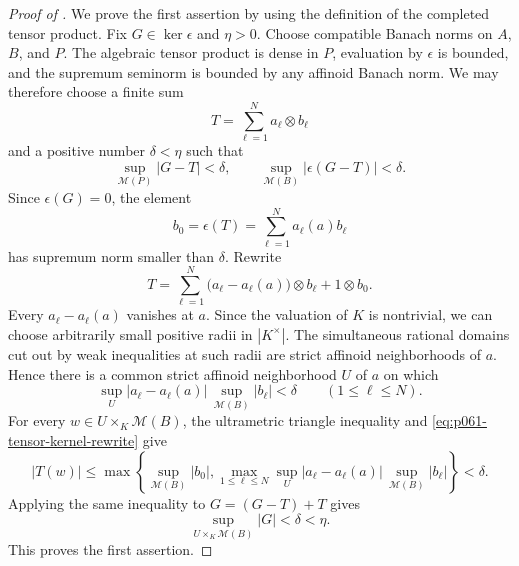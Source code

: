 
\begin{proof}[Proof of ]
We prove the first assertion by using the definition of the completed
tensor product.  Fix \(G\in\ker\epsilon\) and \(\eta>0\).  Choose
compatible Banach norms on \(A\), \(B\), and \(P\).  The algebraic tensor
product is dense in \(P\), evaluation by \(\epsilon\) is bounded, and
the supremum seminorm is bounded by any affinoid Banach norm.  We may
therefore choose a finite sum
\[
                       T=\sum_{\ell=1}^N a_\ell\otimes b_\ell
\]
and a positive number \(\delta<\eta\) such that
\[
 \sup_{\mathcal M(P)}|G-T|<\delta,
 \qquad
 \sup_{\mathcal M(B)}|\epsilon(G-T)|<\delta.
\]
Since \(\epsilon(G)=0\), the element
\[
                       b_0=\epsilon(T)=
                       \sum_{\ell=1}^Na_\ell(a)b_\ell
\]
has supremum norm smaller than \(\delta\).  Rewrite
\begin{equation}
\label{eq:p061-tensor-kernel-rewrite}
 T=\sum_{\ell=1}^N
       \bigl(a_\ell-a_\ell(a)\bigr)\otimes b_\ell+1\otimes b_0.
\end{equation}
Every \(a_\ell-a_\ell(a)\) vanishes at \(a\).  Since the valuation of
\(K\) is nontrivial, we can choose arbitrarily small positive radii in
\(|K^\times|\).  The simultaneous rational domains cut out by weak
inequalities at such radii are strict affinoid neighborhoods of \(a\).
Hence there is a common strict affinoid neighborhood \(U\) of \(a\) on
which
\[
 \sup_U|a_\ell-a_\ell(a)|\,
       \sup_{\mathcal M(B)}|b_\ell|<\delta
 \qquad(1\leq\ell\leq N).
\]
For every \(w\in U\times_K\mathcal M(B)\), the ultrametric triangle
inequality and \eqref{eq:p061-tensor-kernel-rewrite} give
\[
 |T(w)|\leq
 \max\!\left\{
   \sup_{\mathcal M(B)}|b_0|,
   \max_{1\leq\ell\leq N}
   \sup_U|a_\ell-a_\ell(a)|\,
   \sup_{\mathcal M(B)}|b_\ell|
 \right\}<\delta.
\]
Applying the same inequality to \(G=(G-T)+T\) gives
\[
                  \sup_{U\times_K\mathcal M(B)}|G|<\delta<\eta.
\]
This proves the first assertion.


\end{proof}
